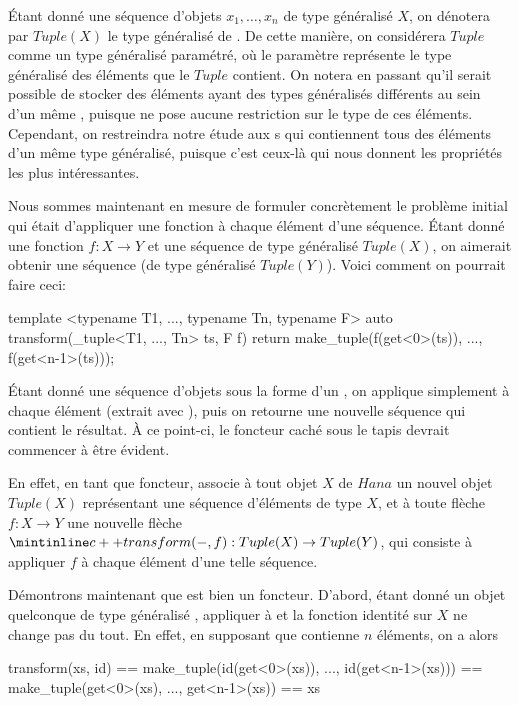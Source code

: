 Étant donné une séquence d'objets $x_1, \hdots, x_n$ de type généralisé $X$,
on dénotera par $Tuple(X)$ le type généralisé de .
De cette manière, on considérera $Tuple$ comme un type généralisé paramétré,
où le paramètre représente le type généralisé des éléments que le $Tuple$
contient. On notera en passant qu'il serait possible de stocker des éléments
ayant des types généralisés différents au sein d'un même , puisque
 ne pose aucune restriction sur le type de ces éléments. Cependant,
on restreindra notre étude aux s qui contiennent tous des éléments
d'un même type généralisé, puisque c'est ceux-là qui nous donnent les propriétés
les plus intéressantes.

Nous sommes maintenant en mesure de formuler concrètement le problème initial
qui était d'appliquer une fonction à chaque élément d'une séquence. Étant
donné une fonction $f : X \to Y$ et une séquence 
de type généralisé $Tuple(X)$, on aimerait obtenir une séquence
 (de type généralisé $Tuple(Y)$).
Voici comment on pourrait faire ceci:
\begin{cpp}
    template <typename T1, ..., typename Tn, typename F>
    auto transform(_tuple<T1, ..., Tn> ts, F f) {
        return make_tuple(f(get<0>(ts)), ..., f(get<n-1>(ts)));
    }
\end{cpp}

Étant donné une séquence d'objets sous la forme d'un , on
applique simplement  à chaque élément (extrait avec ),
puis on retourne une nouvelle séquence qui contient le résultat. À ce
point-ci, le foncteur caché sous le tapis devrait commencer à être évident.

En effet, en tant que foncteur,  associe à tout objet $X$ de $Hana$
un nouvel objet $Tuple(X)$ représentant une séquence d'éléments de type $X$,
et à toute flèche $f : X \to Y$ une nouvelle flèche $\icpp{transform(-, f)} :
Tuple(X) \to Tuple(Y)$, qui consiste à appliquer $f$ à chaque élément d'une
telle séquence.

Démontrons maintenant que  est bien un foncteur. D'abord, étant
donné un objet quelconque  de type généralisé ,
appliquer  à  et la fonction identité sur $X$
ne change pas  du tout. En effet, en supposant que 
contienne $n$ éléments, on a alors
\begin{cpp}
    transform(xs, id) == make_tuple(id(get<0>(xs)), ..., id(get<n-1>(xs)))
                      == make_tuple(get<0>(xs), ..., get<n-1>(xs))
                      == xs
\end{cpp}

